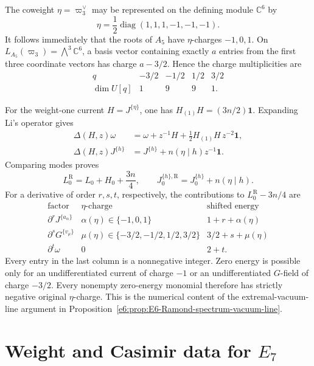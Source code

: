 \documentclass[11pt,reqno]{amsart}
\theoremstyle{definition}
\theoremstyle{remark}
\begin{document}
The coweight \(\eta=\varpi_3^\vee\) may be represented on the defining module
\(\mathbb C^6\) by
\begin{equation*}
  \eta=\frac12\operatorname{diag}(1,1,1,-1,-1,-1).
\end{equation*}
It follows immediately that the roots of \(A_5\) have \(\eta\)-charges
\(-1,0,1\).  On
\(L_{A_5}(\varpi_3)=\bigwedge^3\mathbb C^6\), a basis vector containing exactly
\(a\) entries from the first three coordinate vectors has charge
\(a-3/2\).  Hence the charge multiplicities are
\begin{equation*}
\begin{array}{c|rrrr}
q&-3/2&-1/2&1/2&3/2\\ \hline
\dim U[q]&1&9&9&1.
\end{array}
\end{equation*}

For the weight-one current \(H=J^{\{\eta\}}\), one has
\(H_{(1)}H=(3n/2)\mathbf1\).  Expanding Li's operator gives
\begin{align*}
 \Delta(H,z)\omega
 &=\omega+z^{-1}H+\frac12H_{(1)}H\,z^{-2}\mathbf1,\\
 \Delta(H,z)J^{\{h\}}
 &=J^{\{h\}}+n(\eta\mid h)z^{-1}\mathbf1.
\end{align*}
Comparing modes proves
\[
  L_0^{\mathrm R}=L_0+H_0+\frac{3n}{4},
  \qquad
  J_0^{\{h\},\mathrm R}=J_0^{\{h\}}+n(\eta\mid h).
\]
For a derivative of order \(r,s,t\), respectively, the contributions to
\(L_0^{\mathrm R}-3n/4\) are
\begin{equation*}
\begin{array}{c|c|c}
\text{factor}&\eta\text{-charge}&\text{shifted energy}\\ \hline
\partial^rJ^{\{a_\alpha\}}&\alpha(\eta)\in\{-1,0,1\}
 &1+r+\alpha(\eta)\\
\partial^sG^{\{v_\mu\}}&\mu(\eta)\in\{-3/2,-1/2,1/2,3/2\}
 &3/2+s+\mu(\eta)\\
\partial^t\omega&0&2+t.
\end{array}
\end{equation*}
Every entry in the last column is a nonnegative integer.  Zero energy is possible
only for an undifferentiated current of charge \(-1\) or an undifferentiated
\(G\)-field of charge \(-3/2\).  Every nonempty zero-energy monomial therefore
has strictly negative original \(\eta\)-charge.  This is the numerical content
of the extremal-vacuum-line argument in
Proposition~\ref{e6:prop:E6-Ramond-spectrum-vacuum-line}.
\section{Weight and Casimir data for \texorpdfstring{$E_7$}{E7}}
\end{document}
